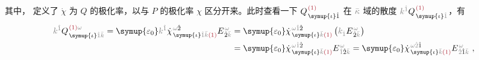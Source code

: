 其中， 定义了 $\dot{\chi}$ 为 $Q$ 的极化率，以与 $P$ 的极化率 $\chi$ 区分开来。此时查看一下 $Q^{\;\! \textcolor{Maroon}{(1)}}_{\;\! \symup{\iota} \hat{1}}$ 在 $\mathcolor{gray}{\bar{\kappa}}$ 域的散度 $\mathcolor{gray}{k^{\hat{1}}} Q^{\;\! \textcolor{Maroon}{(1)}}_{\;\! \symup{\iota} \mathcolor{gray}{\hat{1}}}$，有
\begin{subequations}
\begin{align}
	\mathcolor{gray}{k^{\hat{1}}} Q^{\;\! \textcolor{Maroon}{(1)} \mathcolor{gray}{\omega}}_{\;\! \symup{\iota} \mathcolor{gray}{\hat{1}} \mathcolor{gray}{\bar{k}}} = {\symup{\varepsilon_0}} \mathcolor{gray}{k^{\hat{1}}} \dot{\chi}^{\;\! \mathcolor{gray}{\omega} \hat{2}}_{\;\! \symup{\iota} \mathcolor{gray}{\hat{1}} \mathcolor{gray}{\bar{k}} \textcolor{Maroon}{(1)}} E^{\;\!\mathcolor{gray}{\omega}}_{\;\! \hat{2} \mathcolor{gray}{\bar{k}}} &= {\symup{\varepsilon_0}} \dot{\chi}^{\;\! \mathcolor{gray}{\omega} \mathcolor{gray}{\hat{1}} \hat{2} }_{\;\! \symup{\iota} \mathcolor{gray}{\bar{k}} \textcolor{Maroon}{(1)}} \left( \mathcolor{gray}{k_{\hat{1}}} E^{\;\!\mathcolor{gray}{\omega}}_{\;\! \hat{2} \mathcolor{gray}{\bar{k}}} \right) \label{eq:div-Q(1)_wk} \\ &= {\symup{\varepsilon_0}} \dot{\chi}^{\;\! \mathcolor{gray}{\omega} \mathcolor{gray}{\hat{1}} \hat{2} }_{\;\! \symup{\iota} \mathcolor{gray}{\bar{k}} \textcolor{Maroon}{(1)}} E^{\;\!\mathcolor{gray}{\omega}}_{\;\! \mathcolor{gray}{\hat{1}} \hat{2} \mathcolor{gray}{\bar{k}}} = {\symup{\varepsilon_0}} \dot{\chi}^{\;\! \mathcolor{gray}{\omega} \mathcolor{gray}{\hat{2}} \hat{1} }_{\;\! \symup{\iota} \mathcolor{gray}{\bar{k}} \textcolor{Maroon}{(1)}} E^{\;\!\mathcolor{gray}{\omega}}_{\;\! \mathcolor{gray}{\hat{2}} \hat{1} \mathcolor{gray}{\bar{k}}} \label{eq:div-Q(1)_wk-b}~,
\end{align}
\end{subequations}
